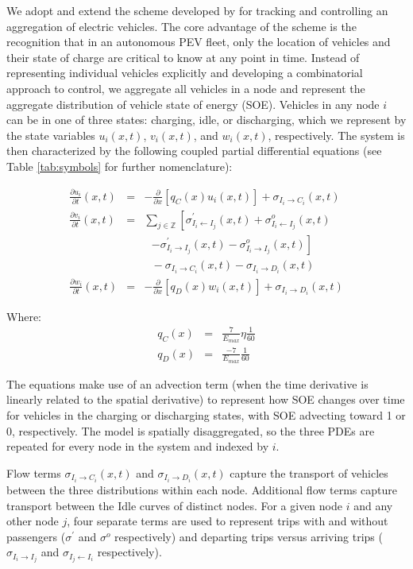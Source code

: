 \documentclass[journal]{IEEEtran}
\begin{document}
We adopt and extend the scheme developed by \cite{lefloch_pde_2016} for tracking and controlling an aggregation of electric vehicles. The core advantage of the scheme is the recognition that in an autonomous PEV fleet, only the location of vehicles and their state of charge are critical to know at any point in time. Instead of representing individual vehicles explicitly and developing a combinatorial approach to control, we aggregate all vehicles in a node and represent the aggregate distribution of vehicle state of energy (SOE). Vehicles in any node $i$ can be in one of three states: charging, idle, or discharging, which we represent by the state variables $u_i(x,t)$, $v_i(x,t)$, and $w_i(x,t)$, respectively. The system is then characterized by the following coupled partial differential equations (see Table \ref{tab:symbols} for further nomenclature):

\begin{eqnarray*}
    \frac{\partial u_i}{\partial t}(x,t) &=& -\frac{\partial}{\partial x}\left[ q_C(x) u_i(x,t) \right] + \sigma_{I_i \rightarrow C_i}(x,t) \\
    \frac{\partial v_i}{\partial t}(x,t) &=& \sum_{j\in\mathbb{Z}} \left[ \sigma_{I_i \leftarrow I_j}^\prime(x,t) + \sigma_{I_i \leftarrow I_j}^o(x,t) \right. \\
    & & ~~~ \left. - \sigma_{I_i \rightarrow I_j}^\prime(x,t) - \sigma_{I_i \rightarrow I_j}^o(x,t) \right] \\
    && ~~~ - \sigma_{I_i \rightarrow C_i}(x,t) - \sigma_{I_i \rightarrow D_i}(x,t) \\
    \frac{\partial w_i}{\partial t}(x,t) &=& -\frac{\partial}{\partial x}\left[ q_D(x) w_i(x,t) \right] + \sigma_{I_i \rightarrow D_i}(x,t) 
\end{eqnarray*}

Where: 
\begin{eqnarray*}
q_C(x) &=& \frac{7}{E_{max}}\eta\frac{1}{60} \\
q_D(x) &=& \frac{-7}{E_{max}}\frac{1}{60}
\end{eqnarray*}

The equations make use of an advection term (when the time derivative is linearly related to the spatial derivative) to represent how SOE changes over time for vehicles in the charging or discharging states, with SOE advecting toward 1 or 0, respectively. The model is spatially disaggregated, so the three PDEs are repeated for every node in the system and indexed by $i$.

Flow terms $\sigma_{I_i \rightarrow C_i}(x,t)$ and $\sigma_{I_i \rightarrow D_i}(x,t)$ capture the transport of vehicles between the three distributions within each node. Additional flow terms capture transport between the Idle curves of distinct nodes. For a given node $i$ and any other node $j$, four separate terms are used to represent trips with and without passengers ($\sigma^\prime$ and $\sigma^o$ respectively) and departing trips versus arriving trips ($\sigma_{I_i \rightarrow I_j}$ and $\sigma_{I_j \leftarrow I_i}$ respectively).
\end{document}
